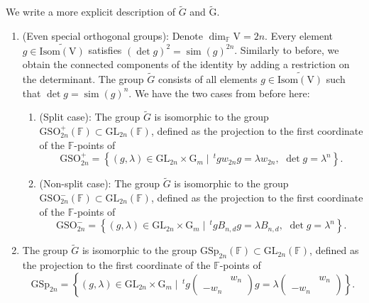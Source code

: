 \documentclass[12pt, reqno]{amsart}
\theoremstyle{definition}
\theoremstyle{definition}
\theoremstyle{definition}
\newcommand{\hermitianSpace}{\mathrm{V}}
\newcommand{\similitudeCharacter}{\operatorname{sim}}
\newcommand{\transpose}[1]{\, {}^{t}#1}
\newcommand{\GL}{\mathrm{GL}}
\newcommand{\GSO}{\mathrm{GSO}}
\newcommand{\GSp}{\mathrm{GSp}}
\newcommand{\GroupExtension}[1]{\widetilde{#1}}
\newcommand{\finiteField}{\mathbb{F}}
\newcommand{\multiplcativeScheme}{\algebraicGroup{G}_m}
\newcommand{\IsometryGroup}{\mathrm{Isom}}
\newcommand{\algebraicGroup}[1]{\boldsymbol{\mathrm{#1}}}
\begin{document}
We write a more explicit description of $\tilde{G}$ and $\tilde{\algebraicGroup{G}}$.
\begin{enumerate}
	\item (Even special orthogonal groups): Denote $\dim_{\finiteField} \hermitianSpace = 2n$. Every element $g \in \widetilde{\IsometryGroup\left(\hermitianSpace\right)}$ satisfies $\left(\det g\right)^2 = \similitudeCharacter\left(g\right)^{2n}$. Similarly to before, we obtain the connected components of the identity by adding a restriction on the determinant. The group $\GroupExtension{G}$ consists of all elements $g \in \GroupExtension{\IsometryGroup\left(\hermitianSpace\right)}$ such that $\det g = \similitudeCharacter\left(g\right)^n$. We have the two cases from before here:
	\begin{enumerate}
		\item (Split case): The group $\GroupExtension{G}$ is isomorphic to the group $\GSO^{+}_{2n}\left(\finiteField\right) \subset \GL_{2n}\left(\finiteField\right)$, defined as the projection to the first coordinate of the $\finiteField$-points of $$\algebraicGroup{\GSO}^{+}_{2n} = \left\{\left(g, \lambda\right) \in \algebraicGroup{\GL}_{2n} \times \multiplcativeScheme \mid \transpose{g} w_{2n} g = \lambda w_{2n},\,\, \det g = \lambda^n\right\}.$$
		\item (Non-split case): The group $\GroupExtension{G}$ is isomorphic to the group $\GSO^{-}_{2n}\left(\finiteField\right) \subset \GL_{2n}\left(\finiteField\right)$, defined as the projection to the first coordinate of the $\finiteField$-points of $$\algebraicGroup{\GSO}^{-}_{2n} = \left\{\left(g, \lambda\right) \in \algebraicGroup{\GL}_{2n} \times \multiplcativeScheme \mid \transpose{g} B_{n,d} g = \lambda B_{n,d},\,\, \det g = \lambda^n\right\}.$$
	\end{enumerate}
	\item The group $\GroupExtension{G}$ is isomorphic to the group $\GSp_{2n}\left(\finiteField\right) \subset \GL_{2n}\left(\finiteField\right)$, defined as the projection to the first coordinate of the $\finiteField$-points of $$\algebraicGroup{\GSp}_{2n} = \left\{\left(g, \lambda\right) \in \algebraicGroup{\GL}_{2n} \times \multiplcativeScheme \mid \transpose{g} \begin{pmatrix}
		& w_n\\
		-w_n
	\end{pmatrix} g = \lambda \begin{pmatrix}
		& w_n\\
		-w_n
	\end{pmatrix}\right\}.$$
\end{enumerate}
\end{document}
